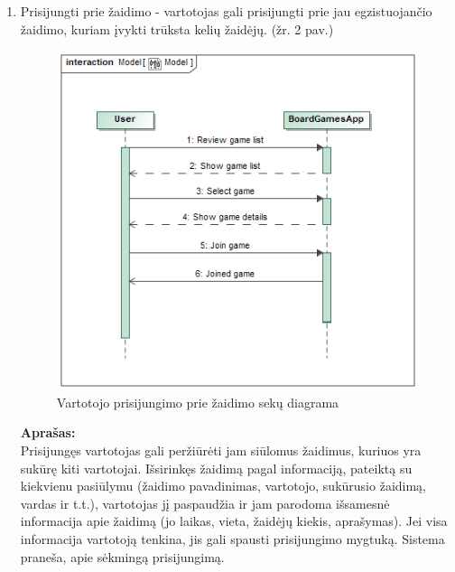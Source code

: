 \documentclass{VUMIFPSkursinis}
\begin{document}
			\begin{enumerate}
			\item Prisijungti prie žaidimo - vartotojas gali prisijungti prie 
				jau egzistuojančio žaidimo, kuriam įvykti trūksta kelių žaidėjų. (žr. 2 pav.)
				\begin{figure}[H]
					\centering
					\includegraphics[scale=0.5]{img/JoinGameSequence}
					\caption{Vartotojo prisijungimo prie žaidimo sekų diagrama}
					\label{img:JoinGameSequence}
				\end{figure}
				\textbf{Aprašas:}\\
					Prisijungęs vartotojas gali peržiūrėti jam siūlomus žaidimus, 
					kuriuos yra sukūrę kiti vartotojai. Išsirinkęs žaidimą pagal 
					informaciją, pateiktą su kiekvienu pasiūlymu (žaidimo pavadinimas, 
					vartotojo, sukūrusio žaidimą, vardas ir t.t.), vartotojas jį 
					paspaudžia ir jam parodoma išsamesnė informacija apie žaidimą 
					(jo laikas, vieta, žaidėjų kiekis, aprašymas). Jei visa informacija 
					vartotoją tenkina, jis gali spausti prisijungimo mygtuką. Sistema 
					praneša, apie sėkmingą prisijungimą.
				

\end{enumerate}
\end{document}
